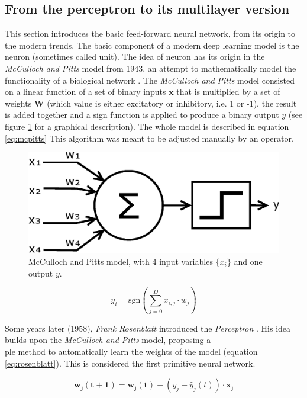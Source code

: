 \subsection{From the perceptron to its multilayer version}

This section introduces the basic feed-forward neural network, from its origin to the modern trends. The basic component of a modern deep learning model is the neuron (sometimes called unit). The idea of neuron has its origin in the \textit{McCulloch and Pitts} model from 1943, an attempt to mathematically model the functionality of a biological network \cite{mccullochPitts1943}. The \textit{McCulloch and Pitts} model consisted on a linear function of a set of binary inputs $\mathbf{x}$ that is multiplied by a set of weights $\mathbf{W}$ (which value is either excitatory or inhibitory, i.e. 1 or -1), the result is added together and a sign function is applied to produce a binary output $y$ (see figure \ref{fig:mcpittsneuron} for a graphical description). The whole model is described in equation \ref{eq:mcpitts} This algorithm was meant to be adjusted manually by an operator.

\begin{figure}
	\centering
	\includegraphics[width=0.4\linewidth]{chapter2/images/mcpittsneuron}
	\caption{McCulloch and Pitts model, with 4 input variables $\{x_i\}$ and one output $y$.}
	\label{fig:mcpittsneuron}
\end{figure}

\begin{equation}
	\label{eq:mcpitts}
	y_i = \mathrm{sgn}\left(\sum_{j=0}^{D} x_{i,j} \cdot w_{j} \right) 
\end{equation}

Some years later (1958), \textit{Frank Rosenblatt} introduced the \textit{Perceptron} \cite{Rosenblatt58}. His idea builds upon the \textit{McCulloch and Pitts} model, proposing a \\
ple method to automatically learn the weights of the model (equation \ref{eq:rosenblatt}). This is considered the first primitive neural network.

\begin{equation}
\label{eq:rosenblatt}
\mathbf{w_j(t+1)} = \mathbf{w_j(t)} + (y_j-\hat{y}_j(t))\cdot \mathbf{x_j}
\end{equation}

